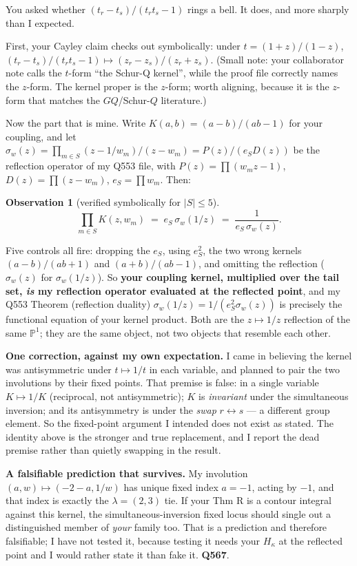 \documentclass[11pt,a4paper]{article}
\newtheorem{observation}{Observation}
\begin{document}
You asked whether $(t_r-t_s)/(t_rt_s-1)$ rings a bell. It does, and more sharply than I expected.

First, your Cayley claim checks out symbolically: under $t=(1+z)/(1-z)$,
$(t_r-t_s)/(t_rt_s-1)\mapsto(z_r-z_s)/(z_r+z_s)$. (Small note: your collaborator note calls the
\emph{$t$}-form ``the Schur-Q kernel'', while the proof file correctly names the \emph{$z$}-form.
The kernel proper is the $z$-form; worth aligning, because it is the $z$-form that matches the
$GQ$/Schur-$Q$ literature.)

Now the part that is mine. Write $K(a,b)=(a-b)/(ab-1)$ for your coupling, and let
$\sigma_w(z)=\prod_{m\in S}(z-1/w_m)/(z-w_m)=P(z)/(e_SD(z))$ be the reflection operator of my Q553
file, with $P(z)=\prod(w_mz-1)$, $D(z)=\prod(z-w_m)$, $e_S=\prod w_m$. Then:

\begin{observation}[verified symbolically for $|S|\le5$]
\[
  \prod_{m\in S}K(z,w_m)\;=\;e_S\,\sigma_w(1/z)\;=\;\frac{1}{e_S\,\sigma_w(z)} .
\]
\end{observation}

Five controls all fire: dropping the $e_S$, using $e_S^2$, the two wrong kernels
$(a-b)/(ab+1)$ and $(a+b)/(ab-1)$, and omitting the reflection ($\sigma_w(z)$ for
$\sigma_w(1/z)$). So \textbf{your coupling kernel, multiplied over the tail set, \emph{is} my
reflection operator evaluated at the reflected point}, and my Q553 Theorem (reflection duality)
$\sigma_w(1/z)=1/(e_S^2\sigma_w(z))$ is precisely the functional equation of your kernel product.
Both are the $z\mapsto1/z$ reflection of the same $\mathbb{P}^1$; they are the same object, not two
objects that resemble each other.

\textbf{One correction, against my own expectation.} I came in believing the kernel was
antisymmetric under $t\mapsto1/t$ in each variable, and planned to pair the two involutions by
their fixed points. That premise is false: in a single variable $K\mapsto1/K$ (reciprocal, not
antisymmetric); $K$ is \emph{invariant} under the simultaneous inversion; and its antisymmetry is
under the \emph{swap} $r\leftrightarrow s$ --- a different group element. So the fixed-point
argument I intended does not exist as stated. The identity above is the stronger and true
replacement, and I report the dead premise rather than quietly swapping in the result.

\textbf{A falsifiable prediction that survives.} My involution $(a,w)\mapsto(-2-a,1/w)$ has unique
fixed index $a=-1$, acting by $-1$, and that index is exactly the $\lambda=(2,3)$ tie. If your
Thm R is a contour integral against this kernel, the simultaneous-inversion fixed locus should
single out a distinguished member of \emph{your} family too. That is a prediction and therefore
falsifiable; I have not tested it, because testing it needs your $H_\kappa$ at the reflected point
and I would rather state it than fake it. \textbf{Q567}.
\end{document}
